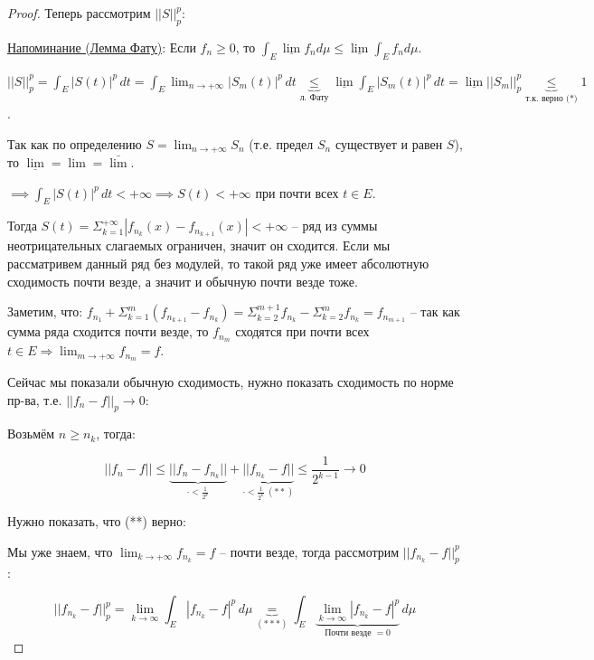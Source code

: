 \begin{proof}
    Теперь рассмотрим $|| S ||^p_p$:

    \underline{Напоминание (Лемма Фату)}: Если $f_n \geq 0$, то $\int_E{\underline{\lim}{f_n d \mu}} \leq \underline{\lim}{\int_E{f_n d \mu}}$.

    $||S||^p_p = \int_{E} |S(t)|^p \, dt = \int_E \lim_{n \to +\infty} |S_m(t)|^p \, dt \underbrace{\leqslant}_{\text{л. Фату}} \underline{\lim} \int_E |S_m(t)|^p \, dt =
    \underline{\lim} ||S_m ||^p_p \underbrace{\leqslant}_{\text{т.к. верно (*)}} 1 $.

    Так как по определению $S = \lim_{n\rightarrow +\infty} S_n$ (т.е. предел $S_n$ существует и равен $S$), то $\underline{\lim} = \lim = \bar{\lim}$.

    $ \implies \int_E |S(t)|^p \, dt < +\infty \implies S(t) < +\infty$ при почти всех $t \in E$.

    Тогда $S(t) = \Sigma_{k=1}^{+\infty} |f_{n_k}(x) - f_{n_{k+1}}(x)| < +\infty$ -- ряд из суммы неотрицательных слагаемых ограничен, значит он сходится. Если мы рассматривем данный ряд без модулей, то такой ряд уже имеет абсолютную сходимость почти везде, а значит и обычную почти везде тоже.\newline

    Заметим, что: $f_{n_1} + \Sigma_{k=1}^{m} (f_{n_{k+1}} - f_{n_k}) = \Sigma_{k=2}^{m+1} f_{n_k} - \Sigma_{k=2}^{m} f_{n_k} = f_{n_{m+1}}$ -- так как сумма ряда сходится почти везде, то $f_{n_m}$ сходятся при почти всех $t \in E \Rightarrow \lim_{m\rightarrow +\infty} f_{n_m} = f$.\newline

    Сейчас мы показали обычную сходимость, нужно показать сходимость по норме пр-ва, т.е. $|| f_n - f ||_p \rightarrow 0$:

    Возьмём $n \geqslant n_k$, тогда:

    $$||f_n - f|| \leqslant \underbrace{||f_n - f_{n_k}||}_{\cdot < \frac{1}{2^k}} + \underbrace{||f_{n_k} - f||}_{\cdot < \frac{1}{2^k} \ (**)} \leqslant \frac{1}{2^{k-1}} \rightarrow 0$$

    Нужно показать, что (**) верно:

    Мы уже знаем, что $\lim_{k\rightarrow +\infty} f_{n_k} = f$ -- почти везде, тогда рассмотрим $|| f_{n_k} - f ||^p_p$:

    $$|| f_{n_k} - f ||^p_p = \lim_{k\rightarrow \infty} \int_{E} |f_{n_k} - f|^p \,d\mu \underbrace{=}_{(***)} \int_{E} \underbrace{\lim_{k\rightarrow \infty} |f_{n_k}-f|^p}_{\text{Почти везде $= 0$}}\, d\mu$$


\end{proof}
